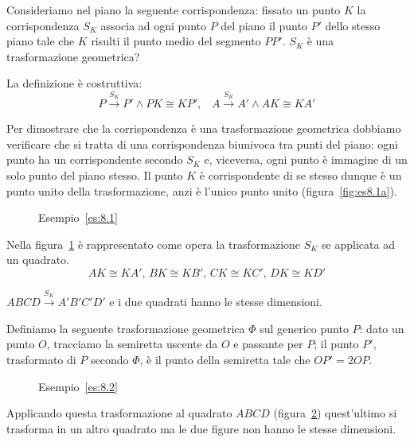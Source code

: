 \begin{exrig}
\begin{esempio}\label{es:8.1}
Consideriamo nel piano la seguente corrispondenza: fissato un punto $K$ la corrispondenza $S_K$ associa ad ogni punto $P$ del piano il punto $P'$ dello stesso piano tale che $K$ risulti il punto medio del segmento $PP'$. $S_K$ è una trasformazione geometrica?\vspace{7pt}

La definizione è costruttiva:
\[P\overset{S_K}{\rightarrow}P' \wedge PK\cong KP'\text{,} \quad  A\overset{S_K}{\rightarrow}A' \wedge AK\cong KA'\]

Per dimostrare che la corrispondenza è una trasformazione geometrica dobbiamo verificare che si tratta di una corrispondenza biunivoca tra punti del piano: ogni punto ha un corrispondente secondo $S_K$ e, viceversa, ogni punto è immagine di un solo punto del piano stesso. Il punto $K$ è corrispondente di se stesso dunque è un punto unito della trasformazione, anzi è l'unico punto unito (figura~\ref{fig:es8.1a}).

\begin{figure}[!htb]
\begin{center}
 \noindent\begin{minipage}{0.4\textwidth}
    \centering
	\caption{Esempio~\ref{es:8.1}}\label{fig:es8.1a}
 \end{minipage}
 \noindent\begin{minipage}{0.4\textwidth}
    \centering
    \caption{Esempio~\ref{es:8.1}}\label{fig:es8.1b}
 \end{minipage}
\end{center}
\end{figure}

Nella figura~\ref{fig:es8.1b} è rappresentato come opera la trasformazione $S_K$ se applicata ad un quadrato.
\[AK\cong KA'\text{, }BK\cong KB'\text{, }CK\cong KC'\text{, }DK\cong KD'\]

$ABCD\overset{S_K}{\rightarrow}A'B'C'D'$ e i due quadrati hanno le stesse dimensioni.
\end{esempio}

\begin{esempio}\label{es:8.2}
Definiamo la seguente trasformazione geometrica $\Phi$ sul generico punto $P$: dato un punto $O$, tracciamo la semiretta uscente da $O$ e passante per $P$; il punto $P'$, trasformato di $P$ secondo $\Phi$, è il punto della semiretta tale che $OP'=2OP$.\vspace{7pt}

\begin{figure}[!htb]
    \centering
	\caption{Esempio~\ref{es:8.2}}\label{fig:es8.2}
\end{figure}

Applicando questa trasformazione al quadrato $ABCD$ (figura~\ref{fig:es8.2}) quest'ultimo si trasforma in un altro quadrato ma le due figure non hanno le stesse dimensioni.
\end{esempio}
\end{exrig}

